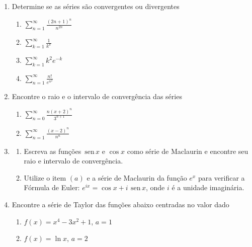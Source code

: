 \documentclass[a4paper,5pt]{amsbook}
\renewcommand{\sin}{\,\mbox{sen}\,}
\newcommand{\ds}{\displaystyle}
\begin{document}
\vspace{1cm}
\begin{enumerate}
\vspace{0.5cm}
\item Determine se as s\'eries s\~ao convergentes ou divergentes
	\begin{enumerate}
        \vspace{0.3cm}
		\item $\ds\sum_{n=1}^\infty \frac{{(2n+1)}^n}{n^{2n}}$
        \vspace{0.3cm}
		\item $\ds\sum_{k=1}^\infty \frac{1}{k^\pi}$
        \vspace{0.3cm}
		\item $\ds\sum_{k=1}^\infty k^2 e^{-k}$
        \vspace{0.3cm}
		\item $\ds\sum_{n=1}^\infty \frac{n!}{e^{n^2}}$
	\end{enumerate}

\vspace{0.5cm}
\item Encontre o raio e o intervalo de converg\^encia das s\'eries
	\begin{enumerate}
        \vspace{0.3cm}
		\item $\ds\sum_{n=0}^\infty \frac{n{(x+2)}^n}{3^{n+1}}$
        \vspace{0.3cm}
		\item $\ds\sum_{n=1}^\infty \frac{{(x-2)}^n}{n^n}$
	\end{enumerate}

\vspace{0.5cm}
\item
	\begin{enumerate}
        \vspace{0.3cm}
        \item Escreva as fun\c{c}\~oes $\sin x$ e $\cos x$ como s\'erie de Maclaurin e
            encontre seu raio e intervalo de converg\^encia.
        \vspace{0.3cm}
        \item Utilize o item $(a)$ e a s\'erie de Maclaurin da fun\c{c}\~ao $e^x$ para
            verificar a F\'ormula de Euler: $e^{ix} = \cos x + i\ \sin x$, onde $i$
            \'e a unidade imagin\'aria.
	\end{enumerate}

\vspace{0.5cm}
\item Encontre a s\'erie de Taylor das fun\c{c}\~oes abaixo centradas no valor dado
	\begin{enumerate}
        \vspace{0.3cm}
		\item $f(x) = x^4 - 3x^2 + 1$, $a = 1$
        \vspace{0.3cm}
		\item $f(x) = \ln x$, $a = 2$
	\end{enumerate}

\end{enumerate}
\end{document}
